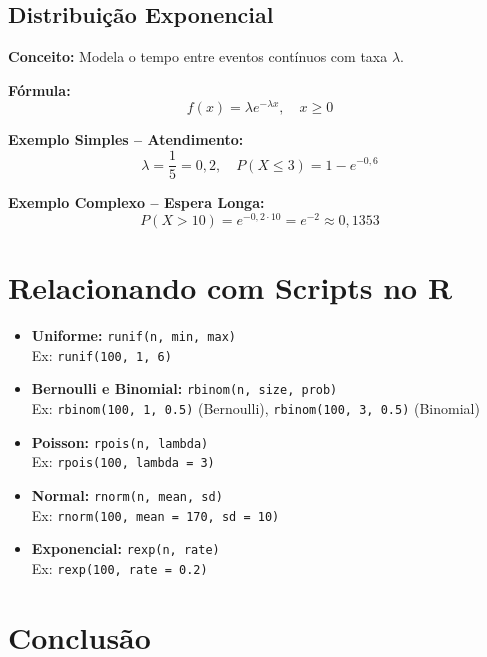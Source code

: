 \documentclass[a4paper,12pt]{article}
\begin{document}
\subsection{Distribuição Exponencial}

\textbf{Conceito:} Modela o tempo entre eventos contínuos com taxa \( \lambda \).

\textbf{Fórmula:}
\begin{equation}
f(x) = \lambda e^{-\lambda x}, \quad x \geq 0
\end{equation}

\textbf{Exemplo Simples – Atendimento:}
\[
\lambda = \frac{1}{5} = 0{,}2, \quad P(X \leq 3) = 1 - e^{-0{,}6}
\]

\textbf{Exemplo Complexo – Espera Longa:}
\[
P(X > 10) = e^{-0{,}2 \cdot 10} = e^{-2} \approx 0{,}1353
\]

\section*{Relacionando com Scripts no R}

\begin{itemize}
    \item \textbf{Uniforme:} \texttt{runif(n, min, max)} \\
    Ex: \texttt{runif(100, 1, 6)}
    
    \item \textbf{Bernoulli e Binomial:} \texttt{rbinom(n, size, prob)} \\
    Ex: \texttt{rbinom(100, 1, 0.5)} (Bernoulli), \texttt{rbinom(100, 3, 0.5)} (Binomial)

    \item \textbf{Poisson:} \texttt{rpois(n, lambda)} \\
    Ex: \texttt{rpois(100, lambda = 3)}

    \item \textbf{Normal:} \texttt{rnorm(n, mean, sd)} \\
    Ex: \texttt{rnorm(100, mean = 170, sd = 10)}

    \item \textbf{Exponencial:} \texttt{rexp(n, rate)} \\
    Ex: \texttt{rexp(100, rate = 0.2)}
\end{itemize}

\section*{Conclusão}
\end{document}
